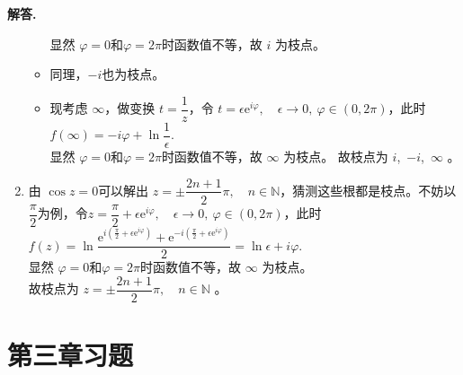 \documentclass[11pt]{ctexart}
\newenvironment{solution}{\par\noindent\textbf{解答. }}{\par}
\begin{document}
\begin{solution}
\begin{enumerate}[(1)]
\begin{itemize}
        显然 $\varphi = 0$和$\varphi = 2\pi$时函数值不等，故 $i$ 为枝点。
        \item 同理，$-i$也为枝点。
        \item 现考虑 $\infty$，做变换 $t = \dfrac{1}{z}$，令 $t = \epsilon\text{e}^{i\varphi},\quad \epsilon\to 0,\ \varphi\in(0,2\pi)$，此时 $f(\infty) = -i\varphi + \ln{\dfrac{1}{\epsilon}}$. \\
        显然 $\varphi = 0$和$\varphi = 2\pi$时函数值不等，故 $\infty$ 为枝点。
        故枝点为 $i$,\ $-i$,\ $\infty$ 。
    \end{itemize}
    \item 由 $\cos{z} = 0$可以解出 $z = \pm \dfrac{2n+1}{2}\pi, \quad n\in\mathbb{N}$，猜测这些根都是枝点。不妨以 $\dfrac{\pi}{2}$为例，令$z = \dfrac{\pi}{2} + \epsilon\text{e}^{i\varphi},\quad \epsilon\to 0,\ \varphi\in(0,2\pi)$，此时 $\displaystyle f(z) = \ln{\dfrac{\text{e}^{i(\frac{\pi}{2}+ \epsilon\text{e}^{i\varphi})}+\text{e}^{-i(\frac{\pi}{2}+ \epsilon\text{e}^{i\varphi})}}{2}} = \ln{\epsilon} + i\varphi$. \\
    显然 $\varphi = 0$和$\varphi = 2\pi$时函数值不等，故 $\infty$ 为枝点。\\
    故枝点为 $z = \pm \dfrac{2n+1}{2}\pi, \quad n\in\mathbb{N}$ 。
    \end{enumerate}
\end{solution}

\newpage
\section{第三章习题}
\end{document}
